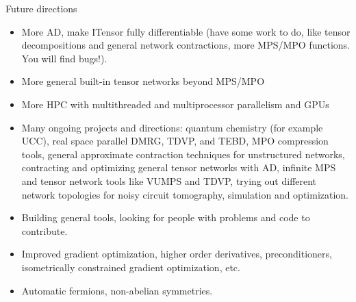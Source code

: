 \begin{frame}{Future directions}

\begin{itemize}[<+->]

  \item More AD, make ITensor fully differentiable (have some work to do, like tensor decompositions and general network contractions, more MPS/MPO functions. You will find bugs!).
  \item More general built-in tensor networks beyond MPS/MPO
  \item More HPC with multithreaded and multiprocessor parallelism and GPUs
  \item Many ongoing projects and directions: quantum chemistry (for example UCC), real space parallel DMRG, TDVP, and TEBD, MPO compression tools, general approximate contraction techniques for unstructured networks, contracting and optimizing general tensor networks with AD, infinite MPS and tensor network tools like VUMPS and TDVP, trying out different network topologies for noisy circuit tomography, simulation and optimization.
  \item Building general tools, looking for people with problems and code to contribute.
  \item Improved gradient optimization, higher order derivatives, preconditioners, isometrically constrained gradient optimization, etc.
  \item Automatic fermions, non-abelian symmetries.

\end{itemize}

\end{frame}
